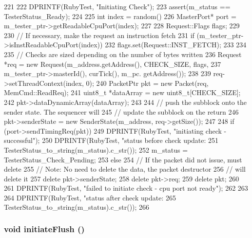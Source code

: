 \begin{DoxyCode}
221 {
222     DPRINTF(RubyTest, "Initiating Check\n");
223     assert(m_status == TesterStatus_Ready);
224 
225     int index = random() %
226     MasterPort* port = m_tester_ptr->getReadableCpuPort(index);
227 
228     Request::Flags flags;
229 
230     // If necessary, make the request an instruction fetch
231     if (m_tester_ptr->isInstReadableCpuPort(index)) {
232         flags.set(Request::INST_FETCH);
233     }
234 
235     // Checks are sized depending on the number of bytes written
236     Request *req = new Request(m_address.getAddress(), CHECK_SIZE, flags,
237                                m_tester_ptr->masterId(), curTick(), m_pc.
      getAddress());
238 
239     req->setThreadContext(index, 0);
240     PacketPtr pkt = new Packet(req, MemCmd::ReadReq);
241     uint8_t *dataArray = new uint8_t[CHECK_SIZE];
242     pkt->dataDynamicArray(dataArray);
243 
244     // push the subblock onto the sender state.  The sequencer will
245     // update the subblock on the return
246     pkt->senderState = new SenderState(m_address, req->getSize());
247 
248     if (port->sendTimingReq(pkt)) {
249         DPRINTF(RubyTest, "initiating check - successful\n");
250         DPRINTF(RubyTest, "status before check update: %
251                 TesterStatus_to_string(m_status).c_str());
252         m_status = TesterStatus_Check_Pending;
253     } else {
254         // If the packet did not issue, must delete
255         // Note: No need to delete the data, the packet destructor
256         // will delete it
257         delete pkt->senderState;
258         delete pkt->req;
259         delete pkt;
260 
261         DPRINTF(RubyTest, "failed to initiate check - cpu port not ready\n");
262     }
263 
264     DPRINTF(RubyTest, "status after check update: %
265             TesterStatus_to_string(m_status).c_str());
266 }
\end{DoxyCode}
\hypertarget{classCheck_aab414465afae8e0fde6717473b5e2dde}{
\subsubsection[{initiateFlush}]{\setlength{\rightskip}{0pt plus 5cm}void initiateFlush ()}}
\label{classCheck_aab414465afae8e0fde6717473b5e2dde}



